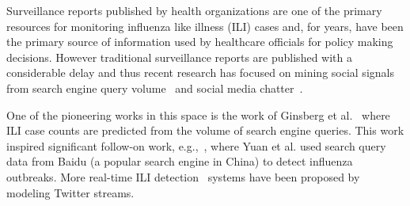 Surveillance reports published by health organizations are one of the
primary resources for monitoring influenza like illness (ILI) cases and,
for years, have been the primary source of information used by healthcare
officials for policy making decisions. However traditional surveillance
reports are published with a considerable delay and thus recent research
has focused on mining social signals from 
search engine query volume~\cite{ref1, ref2} and social
media chatter~\cite{ref3, ref4, ref5, ref6, ref7}.




One of the pioneering works in this 
space is the work of
Ginsberg et al.~\cite{ref2} where 
ILI case counts are predicted 
from the volume of search engine queries. This work 
inspired significant follow-on work, e.g.,~\cite{ref1}, where Yuan 
et al. used search query data from Baidu (a popular search 
engine in China) to detect influenza outbreaks. 
More real-time ILI detection~\cite{ref4} systems have been proposed 
by modeling Twitter streams.

